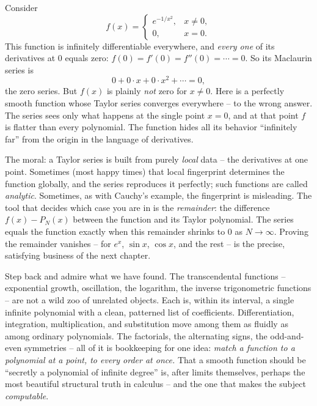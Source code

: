 \begin{trapbox}
Consider
\[
  f(x) = \begin{cases} e^{-1/x^2}, & x \neq 0,\\[2pt] 0, & x = 0. \end{cases}
\]
This function is infinitely differentiable everywhere, and \emph{every one} of its derivatives at $0$ equals zero: $f(0) = f'(0) = f''(0) = \cdots = 0$. So its Maclaurin series is
\[
  0 + 0\cdot x + 0\cdot x^2 + \cdots = 0,
\]
the zero series. But $f(x)$ is plainly \emph{not} zero for $x\neq 0$. Here is a perfectly smooth function whose Taylor series converges everywhere -- to the wrong answer. The series sees only what happens at the single point $x=0$, and at that point $f$ is flatter than every polynomial. The function hides all its behavior ``infinitely far'' from the origin in the language of derivatives.
\end{trapbox}

\begin{intuitionbox}
The moral: a Taylor series is built from purely \emph{local} data -- the derivatives at one point. Sometimes (most happy times) that local fingerprint determines the function globally, and the series reproduces it perfectly; such functions are called \emph{analytic}. Sometimes, as with Cauchy's example, the fingerprint is misleading. The tool that decides which case you are in is the \emph{remainder}: the difference $f(x) - P_N(x)$ between the function and its Taylor polynomial. The series equals the function exactly when this remainder shrinks to $0$ as $N\to\infty$. Proving the remainder vanishes -- for $e^x$, $\sin x$, $\cos x$, and the rest -- is the precise, satisfying business of the next chapter.
\end{intuitionbox}

\begin{aestheticbox}
Step back and admire what we have found. The transcendental functions -- exponential growth, oscillation, the logarithm, the inverse trigonometric functions -- are not a wild zoo of unrelated objects. Each is, within its interval, a single infinite polynomial with a clean, patterned list of coefficients. Differentiation, integration, multiplication, and substitution move among them as fluidly as among ordinary polynomials. The factorials, the alternating signs, the odd-and-even symmetries -- all of it is bookkeeping for one idea: \emph{match a function to a polynomial at a point, to every order at once.} That a smooth function should be ``secretly a polynomial of infinite degree'' is, after limits themselves, perhaps the most beautiful structural truth in calculus -- and the one that makes the subject \emph{computable}.
\end{aestheticbox}


